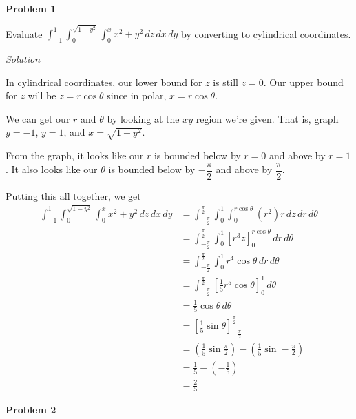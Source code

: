 \documentclass{article}
\newcommand{\lrp}[1]{\left( #1 \right)}
\newcommand{\lrb}[1]{\left[ #1 \right]}
\newcommand{\Solution}{\textit{Solution}}
\begin{document}
{}\textbf{Problem 1}

Evaluate $\displaystyle \int_{-1}^1\int_0^{\sqrt{1-y^2}}\int_0^x x^2+y^2\,dz\,dx\,dy$ by converting to cylindrical coordinates.

\Solution

In cylindrical coordinates, our lower bound for $z$ is still $z=0$. Our upper bound for $z$ will be $z=r\cos\theta$ since in polar, $x=r\cos\theta$.

We can get our $r$ and $\theta$ by looking at the $xy$ region we're given. That is, graph $y=-1$, $y=1$, and $x=\sqrt{1-y^2}$.
\begin{center}
\end{center}
From the graph, it looks like our $r$ is bounded below by $r=0$ and above by $r=1$. It also looks like our $\theta$ is bounded below by $-\dfrac{\pi}{2}$ and above by $\dfrac{\pi}{2}$.

Putting this all together, we get
\begin{align*}
    \int_{-1}^1\int_0^{\sqrt{1-y^2}}\int_0^x x^2+y^2\,dz\,dx\,dy&=\int_{-\frac{\pi}{2}}^{\frac{\pi}{2}}\int_0^1\int_0^{r\cos \theta}(r^2)r\,dz\,dr\,d\theta\\
    &=\int_{-\frac{\pi}{2}}^{\frac{\pi}{2}}\int_0^1\lrb{r^3z}_0^{r\cos\theta}\,dr\,d\theta\\
    &=\int_{-\frac{\pi}{2}}^{\frac{\pi}{2}}\int_0^1 r^4\cos\theta\,dr\,d\theta\\
    &=\int_{-\frac{\pi}{2}}^{\frac{\pi}{2}}\lrb{\frac{1}{5}r^5\cos\theta}_0^1\,d\theta\\
    &=\frac{1}{5}\cos\theta\,d\theta\\
    &=\lrb{\frac{1}{5}\sin\theta}_{-\frac{\pi}{2}}^{\frac{\pi}{2}}\\
    &=\lrp{\frac{1}{5}\sin \frac{\pi}{2}}-\lrp{\frac{1}{5}\sin -\frac{\pi}{2}}\\
    &=\frac{1}{5}-\lrp{-\frac{1}{5}}\\
    &=\boxed{\frac{2}{5}}
\end{align*}
{}\textbf{Problem 2}
\end{document}
